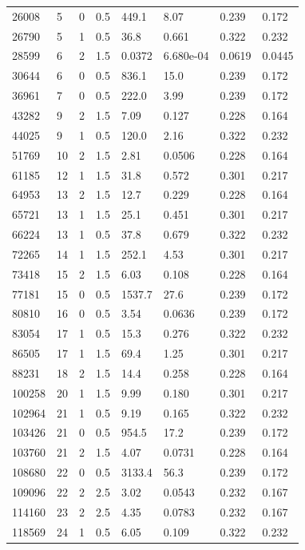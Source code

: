 \documentclass[preview]{standalone}
\begin{document}
{{\begin{tabular}{L{1.2cm}C{1.2cm} C{0.3cm}C{0.5cm} C{1.4cm}C{1.4cm} C{1.4cm}C{1.4cm}}
  26008  &     5  & 0     & 0.5 &  449.1  & 8.07  & 0.239 &  0.172   \\ 
  26790  &     5  & 1     & 0.5 &  36.8  & 0.661  & 0.322 &  0.232   \\ 
  28599  &     6  & 2     & 1.5 &  0.0372  & 6.680e-04  & 0.0619 &  0.0445   \\ 
  30644  &     6  & 0     & 0.5 &  836.1  & 15.0  & 0.239 &  0.172   \\ 
  36961  &     7  & 0     & 0.5 &  222.0  & 3.99  & 0.239 &  0.172   \\ 
  43282  &     9  & 2     & 1.5 &  7.09  & 0.127  & 0.228 &  0.164   \\ 
  44025  &     9  & 1     & 0.5 &  120.0  & 2.16  & 0.322 &  0.232   \\ 
  51769  &    10  & 2     & 1.5 &  2.81  & 0.0506  & 0.228 &  0.164   \\ 
  61185  &    12  & 1     & 1.5 &  31.8  & 0.572  & 0.301 &  0.217   \\ 
  64953  &    13  & 2     & 1.5 &  12.7  & 0.229  & 0.228 &  0.164   \\ 
  65721  &    13  & 1     & 1.5 &  25.1  & 0.451  & 0.301 &  0.217   \\ 
  66224  &    13  & 1     & 0.5 &  37.8  & 0.679  & 0.322 &  0.232   \\ 
  72265  &    14  & 1     & 1.5 &  252.1  & 4.53  & 0.301 &  0.217   \\ 
  73418  &    15  & 2     & 1.5 &  6.03  & 0.108  & 0.228 &  0.164   \\ 
  77181  &    15  & 0     & 0.5 &  1537.7  & 27.6  & 0.239 &  0.172   \\ 
  80810  &    16  & 0     & 0.5 &  3.54  & 0.0636  & 0.239 &  0.172   \\ 
  83054  &    17  & 1     & 0.5 &  15.3  & 0.276  & 0.322 &  0.232   \\ 
  86505  &    17  & 1     & 1.5 &  69.4  & 1.25  & 0.301 &  0.217   \\ 
  88231  &    18  & 2     & 1.5 &  14.4  & 0.258  & 0.228 &  0.164   \\ 
  100258  &    20  & 1     & 1.5 &  9.99  & 0.180  & 0.301 &  0.217   \\ 
  102964  &    21  & 1     & 0.5 &  9.19  & 0.165  & 0.322 &  0.232   \\ 
  103426  &    21  & 0     & 0.5 &  954.5  & 17.2  & 0.239 &  0.172   \\ 
  103760  &    21  & 2     & 1.5 &  4.07  & 0.0731  & 0.228 &  0.164   \\ 
  108680  &    22  & 0     & 0.5 &  3133.4  & 56.3  & 0.239 &  0.172   \\ 
  109096  &    22  & 2     & 2.5 &  3.02  & 0.0543  & 0.232 &  0.167   \\ 
  114160  &    23  & 2     & 2.5 &  4.35  & 0.0783  & 0.232 &  0.167   \\ 
  118569  &    24  & 1     & 0.5 &  6.05  & 0.109  & 0.322 &  0.232   \\ 
\hline 
\end{tabular} 

}}
\end{document}
